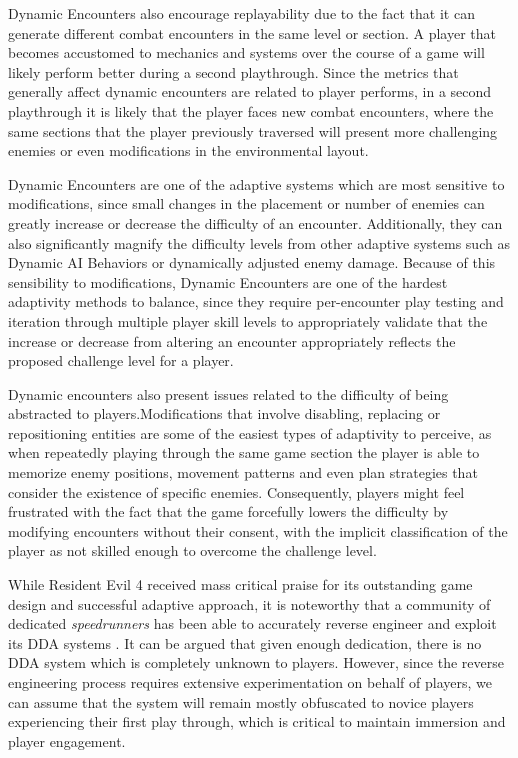 Dynamic Encounters also encourage replayability due to the fact that it can generate different combat encounters in the same level or section. A player that becomes accustomed to mechanics and systems over the course of a game will likely perform better during a second playthrough. Since the metrics that generally affect dynamic encounters are related to player performs, in a second playthrough it is likely that the player faces new combat encounters, where the same sections that the player previously traversed will present more challenging enemies or even modifications in the environmental layout.


Dynamic Encounters are one of the adaptive systems which are most sensitive to modifications, since small changes in the placement or number of enemies can greatly increase or decrease the difficulty of an encounter. Additionally, they can also significantly magnify the difficulty levels from other adaptive systems such as Dynamic AI Behaviors or dynamically adjusted enemy damage. Because of this sensibility to modifications, Dynamic Encounters are one of the hardest adaptivity methods to balance, since they require per-encounter play testing and iteration through multiple player skill levels to appropriately validate that the increase or decrease from altering an encounter appropriately reflects the proposed challenge level for a player.

Dynamic encounters also present issues related to the difficulty of being abstracted to players.Modifications that involve disabling, replacing or repositioning entities are some of the easiest types of adaptivity to perceive, as when repeatedly playing through the same game section the player is able to memorize enemy positions, movement patterns and even plan strategies that consider the existence of specific enemies. Consequently, players might feel frustrated with the fact that the game forcefully lowers the difficulty by modifying encounters without their consent, with the implicit classification of the player as not skilled enough to overcome the challenge level.

While Resident Evil 4 received mass critical praise for its outstanding game design and successful adaptive approach, it is noteworthy that a community of dedicated \emph{speedrunners} has been able to accurately reverse engineer and exploit its DDA systems . It can be argued that given enough dedication, there is no DDA system which is completely unknown to players. However, since the reverse engineering process requires extensive experimentation on behalf of players, we can assume that the system will remain mostly obfuscated to novice players experiencing their first play through, which is critical to maintain immersion and player engagement.

